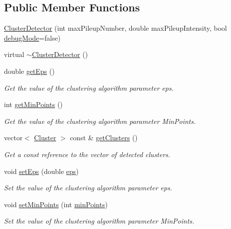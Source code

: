 \subsection*{\-Public \-Member \-Functions}
\begin{DoxyCompactItemize}
\item 
\hyperlink{classmultiscale_1_1analysis_1_1ClusterDetector_a2b5da40fb5e977f5bbfe046feeb1b124}{\-Cluster\-Detector} (int max\-Pileup\-Number, double max\-Pileup\-Intensity, bool \hyperlink{classmultiscale_1_1analysis_1_1Detector_a4b42f796957efd6ee0b8cf7645494a65}{debug\-Mode}=false)
\item 
virtual \hyperlink{classmultiscale_1_1analysis_1_1ClusterDetector_a18f5d5aab155a0a30137364749fb837c}{$\sim$\-Cluster\-Detector} ()
\item 
double \hyperlink{classmultiscale_1_1analysis_1_1ClusterDetector_a5f1699b100e7203720cb7fd1ef73cea1}{get\-Eps} ()
\begin{DoxyCompactList}\small\item\em \-Get the value of the clustering algorithm parameter eps. \end{DoxyCompactList}\item 
int \hyperlink{classmultiscale_1_1analysis_1_1ClusterDetector_af979c73c154bd42ef73d3328e80889ef}{get\-Min\-Points} ()
\begin{DoxyCompactList}\small\item\em \-Get the value of the clustering algorithm parameter \-Min\-Points. \end{DoxyCompactList}\item 
vector$<$ \hyperlink{classmultiscale_1_1analysis_1_1Cluster}{\-Cluster} $>$ const \& \hyperlink{classmultiscale_1_1analysis_1_1ClusterDetector_a0ed0e389d65161b7eef8f377efb20e5c}{get\-Clusters} ()
\begin{DoxyCompactList}\small\item\em \-Get a const reference to the vector of detected clusters. \end{DoxyCompactList}\item 
void \hyperlink{classmultiscale_1_1analysis_1_1ClusterDetector_a35eaa560c893a86c3149471f40c15979}{set\-Eps} (double \hyperlink{classmultiscale_1_1analysis_1_1ClusterDetector_a61e876f87d62245eada8f56d587d39cd}{eps})
\begin{DoxyCompactList}\small\item\em \-Set the value of the clustering algorithm parameter eps. \end{DoxyCompactList}\item 
void \hyperlink{classmultiscale_1_1analysis_1_1ClusterDetector_a190fd17d121e8c22c1ca6e4f5b7a213c}{set\-Min\-Points} (int \hyperlink{classmultiscale_1_1analysis_1_1ClusterDetector_aa94df1adc462be5931ec25ba24122fe9}{min\-Points})
\begin{DoxyCompactList}\small\item\em \-Set the value of the clustering algorithm parameter \-Min\-Points. \end{DoxyCompactList}\end{DoxyCompactItemize}

